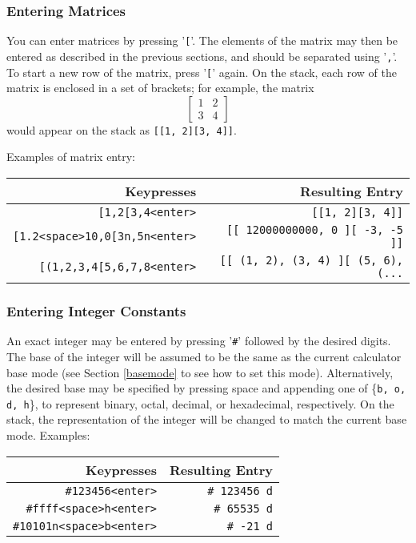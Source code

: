\documentclass[11pt,notitlepage]{article}
\begin{document}
\subsubsection{Entering Matrices}
You can enter matrices by pressing '{\tt [}'.  The elements of the matrix may then be
entered as described in the previous sections, and should be separated using
'{\tt ,}'.  To start a new row of the matrix, press '{\tt [}' again.  On the
stack, each row of the matrix is enclosed in a set of brackets; for example, the
matrix
\begin{displaymath}
   \left[
   \begin{matrix}
      1 & 2 \\
      3 & 4
   \end{matrix}
   \right]
\end{displaymath}
would appear on the stack as {\tt [[1, 2][3, 4]]}.

Examples of matrix entry:
\begin{center}
   \begin{tabular}[t]{|r|r|}
      \hline Keypresses & Resulting Entry \\
      \hline
      {\tt [1,2[3,4<enter>} & {\tt [[1, 2][3, 4]]} \\
      {\tt [1.2<space>10,0[3n,5n<enter>} & {\tt [[ 12000000000, 0 ][ -3, -5 ]]} \\
      {\tt [(1,2,3,4[5,6,7,8<enter>} & {\tt [[ (1, 2), (3, 4) ][ (5, 6), (...} \\
      \hline
   \end{tabular}
\end{center}

\subsubsection{Entering Integer Constants}
An exact integer may be entered by pressing '{\tt \#}' followed by the desired
digits.  The base of the integer will be assumed to be the same as the current
calculator base mode (see Section \ref{basemode} to see how to set this mode).
Alternatively, the desired base may be specified by pressing space and appending
one of \{{\tt b, o, d, h}\}, to represent binary, octal, decimal, or hexadecimal,
respectively.  On the stack, the representation of the integer will be changed
to match the current base mode.  Examples:
\begin{center}
   \begin{tabular}[t]{|r|r|}
      \hline Keypresses & Resulting Entry \\
      \hline
      {\tt \#123456<enter>} & {\tt \# 123456 d} \\
      {\tt \#ffff<space>h<enter>} & {\tt \# 65535 d} \\
      {\tt \#10101n<space>b<enter>} & {\tt \# -21 d} \\
      \hline
   \end{tabular}
\end{center}
\end{document}
